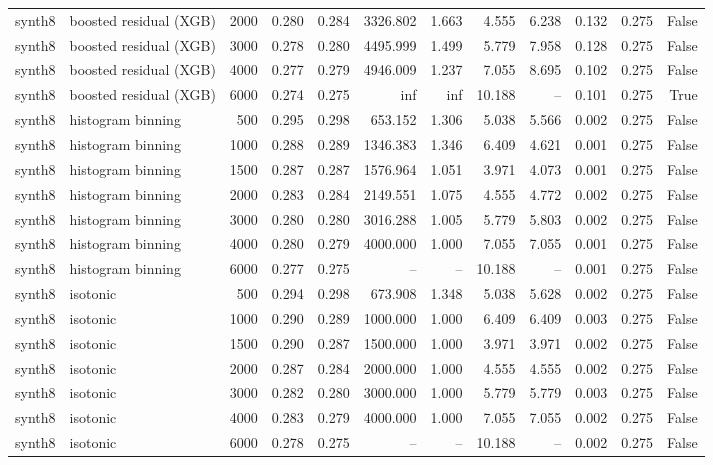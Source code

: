 \begin{tabular}{llrrrrrrrrrr}
synth8 & boosted residual (XGB) & 2000 & 0.280 & 0.284 & 3326.802 & 1.663 & 4.555 & 6.238 & 0.132 & 0.275 & False \\
synth8 & boosted residual (XGB) & 3000 & 0.278 & 0.280 & 4495.999 & 1.499 & 5.779 & 7.958 & 0.128 & 0.275 & False \\
synth8 & boosted residual (XGB) & 4000 & 0.277 & 0.279 & 4946.009 & 1.237 & 7.055 & 8.695 & 0.102 & 0.275 & False \\
synth8 & boosted residual (XGB) & 6000 & 0.274 & 0.275 & inf & inf & 10.188 & -- & 0.101 & 0.275 & True \\
synth8 & histogram binning & 500 & 0.295 & 0.298 & 653.152 & 1.306 & 5.038 & 5.566 & 0.002 & 0.275 & False \\
synth8 & histogram binning & 1000 & 0.288 & 0.289 & 1346.383 & 1.346 & 6.409 & 4.621 & 0.001 & 0.275 & False \\
synth8 & histogram binning & 1500 & 0.287 & 0.287 & 1576.964 & 1.051 & 3.971 & 4.073 & 0.001 & 0.275 & False \\
synth8 & histogram binning & 2000 & 0.283 & 0.284 & 2149.551 & 1.075 & 4.555 & 4.772 & 0.002 & 0.275 & False \\
synth8 & histogram binning & 3000 & 0.280 & 0.280 & 3016.288 & 1.005 & 5.779 & 5.803 & 0.002 & 0.275 & False \\
synth8 & histogram binning & 4000 & 0.280 & 0.279 & 4000.000 & 1.000 & 7.055 & 7.055 & 0.001 & 0.275 & False \\
synth8 & histogram binning & 6000 & 0.277 & 0.275 & -- & -- & 10.188 & -- & 0.001 & 0.275 & False \\
synth8 & isotonic & 500 & 0.294 & 0.298 & 673.908 & 1.348 & 5.038 & 5.628 & 0.002 & 0.275 & False \\
synth8 & isotonic & 1000 & 0.290 & 0.289 & 1000.000 & 1.000 & 6.409 & 6.409 & 0.003 & 0.275 & False \\
synth8 & isotonic & 1500 & 0.290 & 0.287 & 1500.000 & 1.000 & 3.971 & 3.971 & 0.002 & 0.275 & False \\
synth8 & isotonic & 2000 & 0.287 & 0.284 & 2000.000 & 1.000 & 4.555 & 4.555 & 0.002 & 0.275 & False \\
synth8 & isotonic & 3000 & 0.282 & 0.280 & 3000.000 & 1.000 & 5.779 & 5.779 & 0.003 & 0.275 & False \\
synth8 & isotonic & 4000 & 0.283 & 0.279 & 4000.000 & 1.000 & 7.055 & 7.055 & 0.002 & 0.275 & False \\
synth8 & isotonic & 6000 & 0.278 & 0.275 & -- & -- & 10.188 & -- & 0.002 & 0.275 & False \\

\end{tabular}
